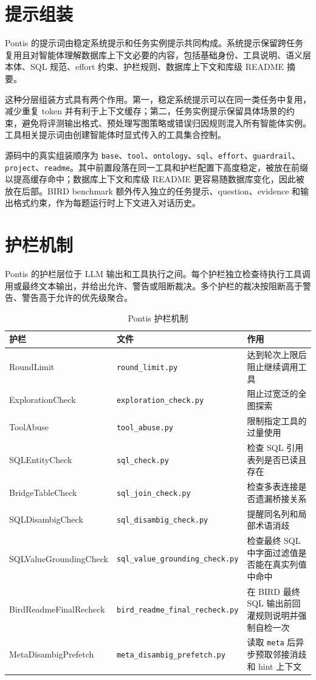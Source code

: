 \documentclass[
    bachelor,
    pdflinks,
]{xjtuthesis}
\newcommand{\topcaption}[1]{\caption{#1}}
\begin{document}
\section{提示组装}

Pontis 的提示词由稳定系统提示和任务实例提示共同构成。系统提示保留跨任务复用且对智能体理解数据库上下文必要的内容，包括基础身份、工具说明、语义层本体、SQL 规范、effort 约束、护栏规则、数据库上下文和库级 README 摘要。

这种分层组装方式具有两个作用。第一，稳定系统提示可以在同一类任务中复用，减少重复 token 并有利于上下文缓存；第二，任务实例提示保留具体场景的约束，避免将评测输出格式、预处理写图策略或错误归因规则混入所有智能体实例。工具相关提示词由创建智能体时显式传入的工具集合控制。

源码中的真实组装顺序为 \texttt{base}、\texttt{tool}、\texttt{ontology}、\texttt{sql}、\texttt{effort}、\texttt{guardrail}、\texttt{project}、\texttt{readme}。其中前置段落在同一工具和护栏配置下高度稳定，被放在前缀以提高缓存命中；数据库上下文和库级 README 更容易随数据库变化，因此被放在后部。BIRD benchmark 额外传入独立的任务提示、question、evidence 和输出格式约束，作为每题运行时上下文进入对话历史。

\section{护栏机制}

Pontis 的护栏层位于 LLM 输出和工具执行之间。每个护栏独立检查待执行工具调用或最终文本输出，并给出允许、警告或阻断裁决。多个护栏的裁决按阻断高于警告、警告高于允许的优先级聚合。

\begin{table}[htbp]\small
  \centering
  \topcaption{Pontis 护栏机制}
  \label{tab:guardrails}
  \begin{tabularx}{\textwidth}{llX}
    \toprule[1.5pt]
    \textbf{护栏} & \textbf{文件} & \textbf{作用} \\
    \midrule[1pt]
    RoundLimit & \texttt{round\_limit.py} & 达到轮次上限后阻止继续调用工具 \\
    ExplorationCheck & \texttt{exploration\_check.py} & 阻止过宽泛的全图探索 \\
    ToolAbuse & \texttt{tool\_abuse.py} & 限制指定工具的过量使用 \\
    SQLEntityCheck & \texttt{sql\_check.py} & 检查 SQL 引用表列是否已读且存在 \\
    BridgeTableCheck & \texttt{sql\_join\_check.py} & 检查多表连接是否遗漏桥接关系 \\
    SQLDisambigCheck & \texttt{sql\_disambig\_check.py} & 提醒同名列和局部术语消歧 \\
    SQLValueGroundingCheck & \texttt{sql\_value\_grounding\_check.py} & 检查最终 SQL 中字面过滤值是否能在真实列值中命中 \\
    BirdReadmeFinalRecheck & \texttt{bird\_readme\_final\_recheck.py} & 在 BIRD 最终 SQL 输出前回灌规则说明并强制自检一次 \\
    MetaDisambigPrefetch & \texttt{meta\_disambig\_prefetch.py} & 读取 \texttt{meta} 后异步预取邻接消歧和 hint 上下文 \\
    \bottomrule[1.5pt]
  \end{tabularx}
\end{table}
\end{document}
